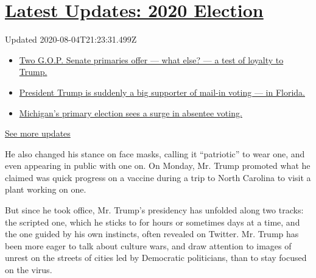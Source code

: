 \hypertarget{latest-updates-2020-election}{%
\section{\texorpdfstring{\href{https://www.nytimes3xbfgragh.onion/2020/08/04/us/elections/primary-election-michigan-arizona-kansas.html?action=click\&pgtype=Article\&state=default\&region=MAIN_CONTENT_1\&context=storylines_live_updates}{Latest
Updates: 2020
Election}}{Latest Updates: 2020 Election}}\label{latest-updates-2020-election}}

Updated 2020-08-04T21:23:31.499Z

\begin{itemize}
\tightlist
\item
  \href{https://www.nytimes3xbfgragh.onion/2020/08/04/us/elections/primary-election-michigan-arizona-kansas.html?action=click\&pgtype=Article\&state=default\&region=MAIN_CONTENT_1\&context=storylines_live_updates\#link-3924dd44}{Two
  G.O.P. Senate primaries offer --- what else? --- a test of loyalty to
  Trump.}
\item
  \href{https://www.nytimes3xbfgragh.onion/2020/08/04/us/elections/primary-election-michigan-arizona-kansas.html?action=click\&pgtype=Article\&state=default\&region=MAIN_CONTENT_1\&context=storylines_live_updates\#link-32b39e33}{President
  Trump is suddenly a big supporter of mail-in voting --- in Florida.}
\item
  \href{https://www.nytimes3xbfgragh.onion/2020/08/04/us/elections/primary-election-michigan-arizona-kansas.html?action=click\&pgtype=Article\&state=default\&region=MAIN_CONTENT_1\&context=storylines_live_updates\#link-ab1004d}{Michigan's
  primary election sees a surge in absentee voting.}
\end{itemize}

\href{https://www.nytimes3xbfgragh.onion/2020/08/04/us/elections/primary-election-michigan-arizona-kansas.html?action=click\&pgtype=Article\&state=default\&region=MAIN_CONTENT_1\&context=storylines_live_updates}{See
more updates}

He also changed his stance on face masks, calling it ``patriotic'' to
wear one, and even appearing in public with one on. On Monday, Mr. Trump
promoted what he claimed was quick progress on a vaccine during a trip
to North Carolina to visit a plant working on one.

But since he took office, Mr. Trump's presidency has unfolded along two
tracks: the scripted one, which he sticks to for hours or sometimes days
at a time, and the one guided by his own instincts, often revealed on
Twitter. Mr. Trump has been more eager to talk about culture wars, and
draw attention to images of unrest on the streets of cities led by
Democratic politicians, than to stay focused on the virus.

